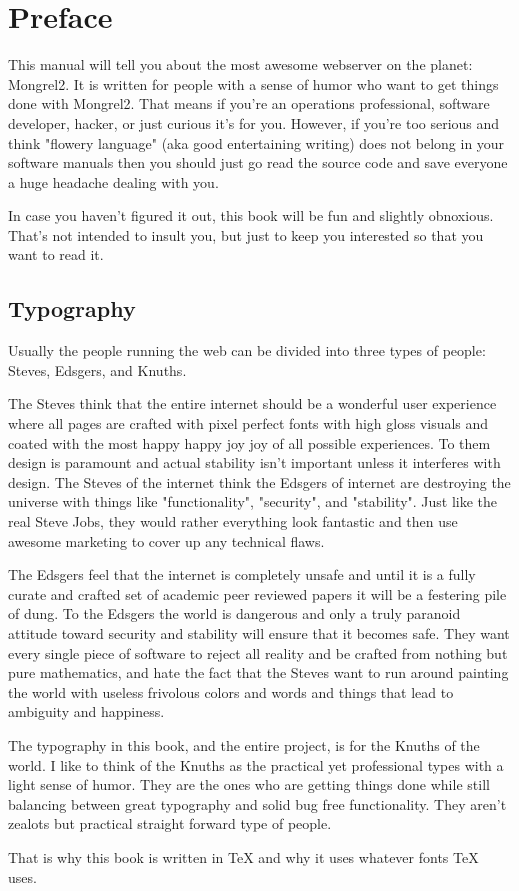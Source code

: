\chapter*{Preface}

This manual will tell you about the most awesome webserver on the planet:
Mongrel2.  It is written for people with a sense of humor who want to get
things done with Mongrel2.  That means if you're an operations professional,
software developer, hacker, or just curious it's for you.  However, if you're
too serious and think "flowery language" (aka good entertaining writing) does
not belong in your software manuals then you should just go read the source
code and save everyone a huge headache dealing with you.

In case you haven't figured it out, this book will be fun and slightly
obnoxious.  That's not intended to insult you, but just to keep you interested
so that you want to read it.


\section*{Typography}

Usually the people running the web can be divided into three types of people:  Steves,
Edsgers, and Knuths.

The Steves think that the entire internet should be a wonderful user experience
where all pages are crafted with pixel perfect fonts with high gloss visuals
and coated with the most happy happy joy joy of all possible experiences.  To
them design is paramount and actual stability isn't important unless it
interferes with design.  The Steves of the internet think the Edsgers of
internet are destroying the universe with things like "functionality",
"security", and "stability".  Just like the real Steve Jobs, they would rather
everything look fantastic and then use awesome marketing to cover up any
technical flaws.

The Edsgers feel that the internet is completely unsafe and until it is a fully
curate and crafted set of academic peer reviewed papers it will be a festering
pile of dung.  To the Edsgers the world is dangerous and only a truly paranoid
attitude toward security and stability will ensure that it becomes safe.  They
want every single piece of software to reject all reality and be crafted from
nothing but pure mathematics, and hate the fact that the Steves want to run
around painting the world with useless frivolous colors and words and things
that lead to ambiguity and happiness.

The typography in this book, and the entire project, is for the Knuths of the
world.  I like to think of the Knuths as the practical yet professional types
with a light sense of humor.  They are the ones who are getting things done
while still balancing between great typography and solid bug free
functionality.  They aren't zealots but practical straight forward type of
people.

That is why this book is written in TeX and why it uses whatever fonts TeX uses.




